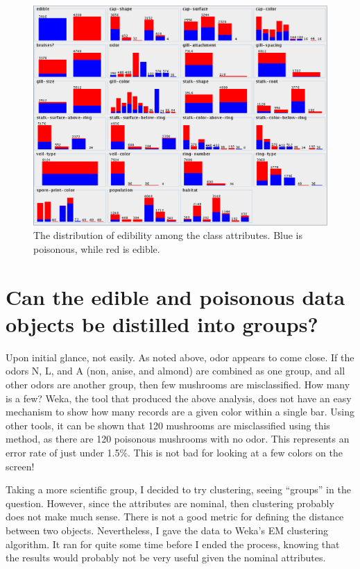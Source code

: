 \documentclass[margin,letterpaper,11pt]{scrartcl}
\newlength \figwidth
\begin{document}
\begin{figure}[!htb]
\begin{center}
   \includegraphics[width=\figwidth]{images/summary.eps}
   \caption{The distribution of edibility among the class attributes. Blue is
   poisonous, while red is edible.}
   \label{fig:summary_stat}
\end{center}
\end{figure}

\section{Can the edible and poisonous data objects be distilled into groups?}

Upon initial glance, not easily. As noted above, odor appears to come close.
If the odors N, L, and A (non, anise, and almond) are combined as one group,
and all other odors are another group, then few mushrooms are misclassified.
How many is a few? Weka, the tool that produced the above analysis, does not
have an easy mechanism to show how many records are a given color within a
single bar. Using other tools, it can be shown that 120 mushrooms are
misclassified using this method, as there are 120 poisonous mushrooms with no
odor. This represents an error rate of just under 1.5\%. This is not bad for
looking at a few colors on the screen!

Taking a more scientific group, I decided to try clustering, seeing ``groups''
in the question. However, since the attributes are nominal, then clustering
probably does not make much sense. There is not a good metric for defining the
distance between two objects. Nevertheless, I gave the data to Weka's EM
clustering algorithm. It ran for quite some time before I ended the process,
knowing that the results would probably not be very useful given the nominal
attributes.
\end{document}
